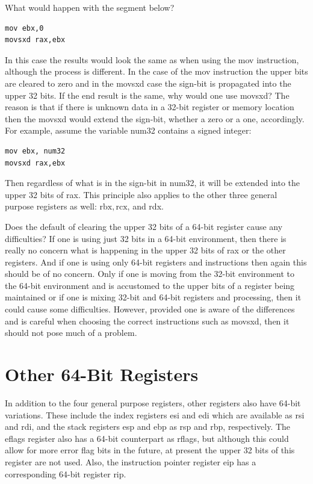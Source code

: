 \documentclass[10pt]{book}
\begin{document}
What would happen with the segment below?
\begin{verbatim}
mov ebx,0
movsxd rax,ebx
\end{verbatim}

In this case the results would look the same as when using the mov instruction, although the process is different. In the case of the mov instruction the upper bits are cleared to zero and in the movsxd case the sign-bit is propagated into the upper 32 bits. If the end result is the same, why would one use movsxd? The reason is that if there is unknown data in a 32-bit register or memory location then the movsxd would extend the sign-bit, whether a zero or a one, accordingly. For example, assume the variable num32 contains a signed integer:

\begin{verbatim}
mov ebx, num32
movsxd rax,ebx
\end{verbatim}

Then regardless of what is in the sign-bit in num32, it will be extended into the upper 32 bits of rax. This principle also applies to the other three general purpose registers as well: $\mathrm{rbx}, \mathrm{rcx}$, and rdx.

Does the default of clearing the upper 32 bits of a 64-bit register cause any difficulties? If one is using just 32 bits in a 64-bit environment, then there is really no concern what is happening in the upper 32 bits of rax or the other registers. And if one is using only 64-bit registers and instructions then again this should be of no concern. Only if one is moving from the 32-bit environment to the 64-bit environment and is accustomed to the upper bits of a register being maintained or if one is mixing 32-bit and 64-bit registers and processing, then it could cause some difficulties. However, provided one is aware of the differences and is careful when choosing the correct instructions such as movsxd, then it should not pose much of a problem.

\section{Other 64-Bit Registers}
In addition to the four general purpose registers, other registers also have 64-bit variations. These include the index registers esi and edi which are available as rsi and rdi, and the stack registers esp and ebp as rsp and rbp, respectively. The eflags register also has a 64-bit counterpart as rflags, but although this could allow for more error flag bits in the future, at present the upper 32 bits of this register are not used. Also, the instruction pointer register eip has a corresponding 64-bit register rip.
\end{document}
